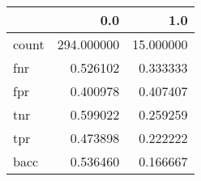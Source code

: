 \begin{tabular}{lrr}
\toprule
{} &         0.0 &        1.0 \\
\midrule
count &  294.000000 &  15.000000 \\
fnr   &    0.526102 &   0.333333 \\
fpr   &    0.400978 &   0.407407 \\
tnr   &    0.599022 &   0.259259 \\
tpr   &    0.473898 &   0.222222 \\
bacc  &    0.536460 &   0.166667 \\
\bottomrule
\end{tabular}

